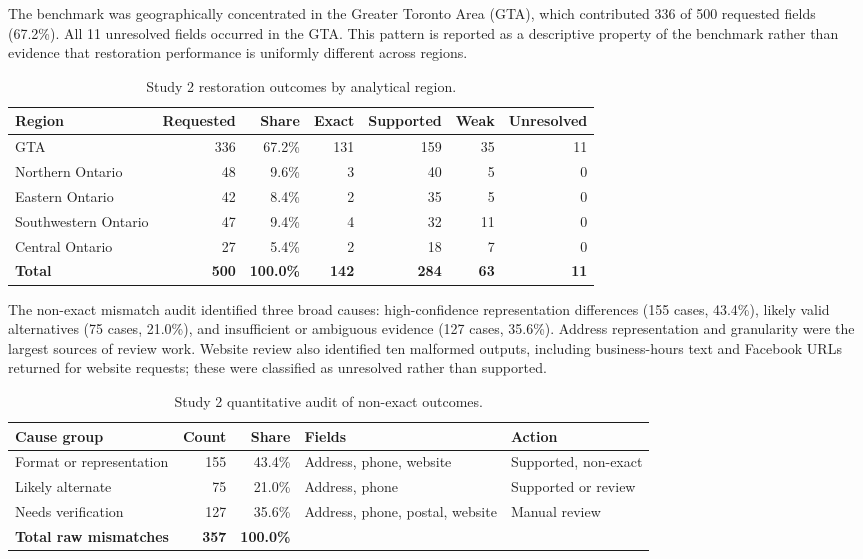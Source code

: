\documentclass[journal,article,submit,moreauthors]{Definitions/mdpi}
\begin{document}
The benchmark was geographically concentrated in the Greater Toronto Area (GTA), which contributed 336 of 500 requested fields (67.2\%). All 11 unresolved fields occurred in the GTA. This pattern is reported as a descriptive property of the benchmark rather than evidence that restoration performance is uniformly different across regions.

\begin{table}[H]
\caption{Study 2 restoration outcomes by analytical region.}
\label{tab:journal_study2_geography}
\small
\begin{tabularx}{\textwidth}{@{}Xrrrrrr@{}}
\toprule
\textbf{Region} & \textbf{Requested} & \textbf{Share} & \textbf{Exact} & \textbf{Supported} & \textbf{Weak} & \textbf{Unresolved} \\
\midrule
GTA & 336 & 67.2\% & 131 & 159 & 35 & 11 \\
Northern Ontario & 48 & 9.6\% & 3 & 40 & 5 & 0 \\
Eastern Ontario & 42 & 8.4\% & 2 & 35 & 5 & 0 \\
Southwestern Ontario & 47 & 9.4\% & 4 & 32 & 11 & 0 \\
Central Ontario & 27 & 5.4\% & 2 & 18 & 7 & 0 \\
\textbf{Total} & \textbf{500} & \textbf{100.0\%} & \textbf{142} & \textbf{284} & \textbf{63} & \textbf{11} \\
\bottomrule
\end{tabularx}
\end{table}

The non-exact mismatch audit identified three broad causes: high-confidence representation differences (155 cases, 43.4\%), likely valid alternatives (75 cases, 21.0\%), and insufficient or ambiguous evidence (127 cases, 35.6\%). Address representation and granularity were the largest sources of review work. Website review also identified ten malformed outputs, including business-hours text and Facebook URLs returned for website requests; these were classified as unresolved rather than supported.

\begin{table}[H]
\caption{Study 2 quantitative audit of non-exact outcomes.}
\label{tab:journal_study2_root_causes}
\small
\begin{tabularx}{\textwidth}{@{}>{\raggedright\arraybackslash}Xrr>{\raggedright\arraybackslash}X>{\raggedright\arraybackslash}X@{}}
\toprule
\textbf{Cause group} & \textbf{Count} & \textbf{Share} & \textbf{Fields} & \textbf{Action} \\
\midrule
Format or representation & 155 & 43.4\% & Address, phone, website & Supported, non-exact \\
Likely alternate & 75 & 21.0\% & Address, phone & Supported or review \\
Needs verification & 127 & 35.6\% & Address, phone, postal, website & Manual review \\
\textbf{Total raw mismatches} & \textbf{357} & \textbf{100.0\%} & & \\
\bottomrule
\end{tabularx}
\end{table}
\end{document}
